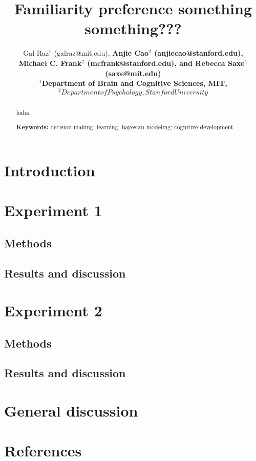 \documentclass[10pt, letterpaper]{article}
\title{Familiarity preference something something???}
\author{Gal Raz$^1$ (galraz@mit.edu), \bf{Anjie Cao$^2$  (anjiecao@stanford.edu)},\\ \bf{Michael C. Frank$^2$ (mcfrank@stanford.edu)},
 and \bf{Rebecca Saxe$^1$ (saxe@mit.edu)} \\
$^1$Department of Brain and Cognitive Sciences, MIT, $^2Department of Psychology, Stanford University$ \\ }
\begin{document}
\maketitle

\begin{abstract}
haha

\textbf{Keywords:}
decision making; learning; bayesian modeling; cognitive development
\end{abstract}

\hypertarget{introduction}{%
\section{Introduction}\label{introduction}}

\hypertarget{experiment-1}{%
\section{Experiment 1}\label{experiment-1}}

\hypertarget{methods}{%
\subsection{Methods}\label{methods}}

\hypertarget{results-and-discussion}{%
\subsection{Results and discussion}\label{results-and-discussion}}

\hypertarget{experiment-2}{%
\section{Experiment 2}\label{experiment-2}}

\hypertarget{methods-1}{%
\subsection{Methods}\label{methods-1}}

\hypertarget{results-and-discussion-1}{%
\subsection{Results and discussion}\label{results-and-discussion-1}}

\hypertarget{general-discussion}{%
\section{General discussion}\label{general-discussion}}

\hypertarget{references}{%
\section{References}\label{references}}

\setlength{\parindent}{-0.1in} 
\setlength{\leftskip}{0.125in}

\noindent


\end{document}
